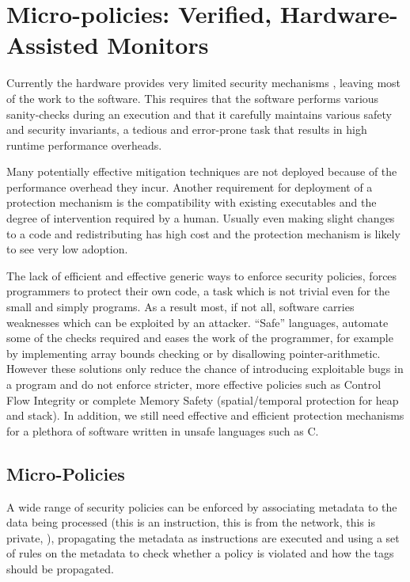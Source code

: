 \chapter{Micro-policies: Verified, Hardware-Assisted Monitors}\label{ch:policies}
Currently the hardware provides very limited security mechanisms ,
leaving most of the work to the software. This requires that the software
performs various sanity-checks during an execution and that it carefully
maintains various safety and security invariants, a tedious and error-prone task
that results in high runtime performance overheads.

Many potentially effective mitigation techniques are not deployed because of the
performance overhead they incur. Another requirement for deployment of a
protection mechanism is the compatibility with existing executables and
the degree of intervention required by a human.
Usually even making slight changes to a code and redistributing has high cost
and the protection mechanism is likely to see very low adoption.

The lack of efficient and effective generic ways to enforce security policies,
forces programmers to protect their own code, a task which is not trivial even
for the small and simply programs. As a result most, if not all, software
carries weaknesses which can be exploited by an attacker. ``Safe'' languages,
automate some of the checks required and eases the work of the programmer,
for example by implementing array bounds checking or by disallowing
pointer-arithmetic. However these solutions only reduce the chance of
introducing exploitable bugs in a program and do not enforce stricter,
more effective policies such as Control Flow Integrity
or complete Memory Safety (spatial/temporal protection for heap and stack).
In addition, we still need effective and efficient protection mechanisms for a
plethora of software written in unsafe languages such as C.

\section{Micro-Policies}\label{sec:micropolicies}


A wide range of security policies can be enforced by associating metadata
to the data being processed (\EG this is an instruction, this is from the
network, this is private, \ETC), propagating the metadata as
instructions are executed and using a set of rules on the metadata to check
whether a policy is violated and how the tags should be propagated.

